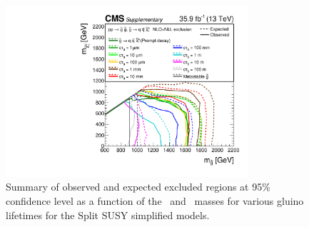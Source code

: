 \begin{figure}[!t]
\centering
\includegraphics[width=0.8\textwidth]{figs/results/T1qqqqLLSummary}
\caption{Summary of observed and expected excluded regions at 95\% confidence 
level as a function of the \gluino~and \neutralino~masses for various gluino 
lifetimes for the Split SUSY simplified models.}
\label{fig:limits-summary} 
\end{figure}

